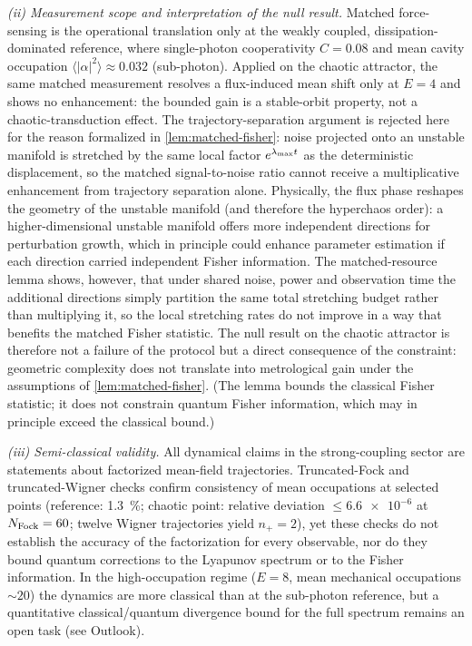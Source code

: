\documentclass[Phys]{SciPost}
\begin{document}
\emph{(ii) Measurement scope and interpretation of the null result.} Matched force-sensing is the operational translation only at the weakly coupled, dissipation-dominated reference, where single-photon cooperativity $C=\num{0.08}$ and mean cavity occupation $\langle|\alpha|^2\rangle\approx\num{0.032}$ (sub-photon). Applied on the chaotic attractor, the same matched measurement resolves a flux-induced mean shift only at $E=\num{4}$ and shows no enhancement: the bounded gain is a stable-orbit property, not a chaotic-transduction effect. The trajectory-separation argument \cite{Xu2025,muthukumar2025doi} is rejected here for the reason formalized in \cref{lem:matched-fisher}: noise projected onto an unstable manifold is stretched by the same local factor $e^{\lambda_{\rm max}t}$ as the deterministic displacement, so the matched signal-to-noise ratio cannot receive a multiplicative enhancement from trajectory separation alone. Physically, the flux phase reshapes the geometry of the unstable manifold (and therefore the hyperchaos order): a higher-dimensional unstable manifold offers more independent directions for perturbation growth, which in principle could enhance parameter estimation if each direction carried independent Fisher information. The matched-resource lemma shows, however, that under shared noise, power and observation time the additional directions simply partition the same total stretching budget rather than multiplying it, so the local stretching rates do not improve in a way that benefits the matched Fisher statistic. The null result on the chaotic attractor is therefore not a failure of the protocol but a direct consequence of the constraint: geometric complexity does not translate into metrological gain under the assumptions of \cref{lem:matched-fisher}. (The lemma bounds the classical Fisher statistic; it does not constrain quantum Fisher information, which may in principle exceed the classical bound.)

\emph{(iii) Semi-classical validity.} All dynamical claims in the strong-coupling sector are statements about factorized mean-field trajectories. Truncated-Fock and truncated-Wigner checks confirm consistency of mean occupations at selected points (reference: \qty{1.3}{\percent}; chaotic point: relative deviation $\le\num{6.6e-6}$ at $N_{\rm Fock}=\num{60}$; twelve Wigner trajectories yield $n_+=2$), yet these checks do not establish the accuracy of the factorization for every observable, nor do they bound quantum corrections to the Lyapunov spectrum or to the Fisher information. In the high-occupation regime ($E=\num{8}$, mean mechanical occupations $\sim 20$) the dynamics are more classical than at the sub-photon reference, but a quantitative classical/quantum divergence bound for the full spectrum remains an open task (see Outlook).
\end{document}
